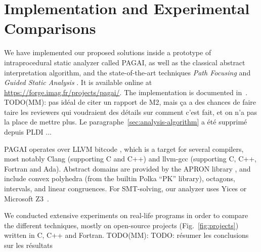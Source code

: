 \documentclass{llncs}
\newcommand{\MM}[1]{{\color{blue} TODO(MM): #1}}
\newcommand{\DM}[1]{{\color{violet} TODO(DM): #1}}
\newcommand{\MM}[1]{}
\newcommand{\DM}[1]{}
\begin{document}
\section{Implementation and Experimental Comparisons}
\label{sec:experiments}

We have implemented our proposed solutions inside a prototype of intraprocedural
static analyzer called PAGAI,
as well as the classical abstract interpretation algorithm, and the state-of-the-art
techniques \emph{Path Focusing} \cite{Monniaux_Gonnord_SAS11} and \emph{Guided
Static Analysis} \cite{DBLP:conf/sas/GopanR07}. It is
available online at \url{https://forge.imag.fr/projects/pagai/}. The
implementation is documented in~\cite{julien-henry-m2r}.
\MM{pas idéal de citer un rapport de M2, mais ça a des chances de
  faire taire les reviewers qui voudraient des détails sur comment
  c'est fait, et on n'a pas la place de mettre plus. Le
  paragraphe~\ref{sec:analysis-algorithm} a été supprimé depuis
  PLDI ...}

%
PAGAI operates over LLVM bitcode \cite{LLVM_langref,Lattner:2004:LCF:977395.977673}, which is a target for several compilers, most notably Clang (supporting C and C++) and llvm-gcc (supporting C, C++, Fortran and Ada).
Abstract domains are provided by the APRON library \cite{DBLP:conf/cav/JeannetM09}, and include convex polyhedra (from the builtin Polka ``PK'' library), octagons, intervals, and linear congruences.
For SMT-solving, our analyzer uses Yices
\cite{DBLP:conf/cav/DutertreM06} or Microsoft Z3~\cite{DBLP:conf/tacas/MouraB08}.

We conducted extensive experiments on real-life programs in order to compare the
different techniques, mostly on open-source projects (Fig.~\ref{fig:projects}) written in C, C++ and Fortran.
\MM{TODO: résumer les conclusions sur les résultats}
\end{document}
